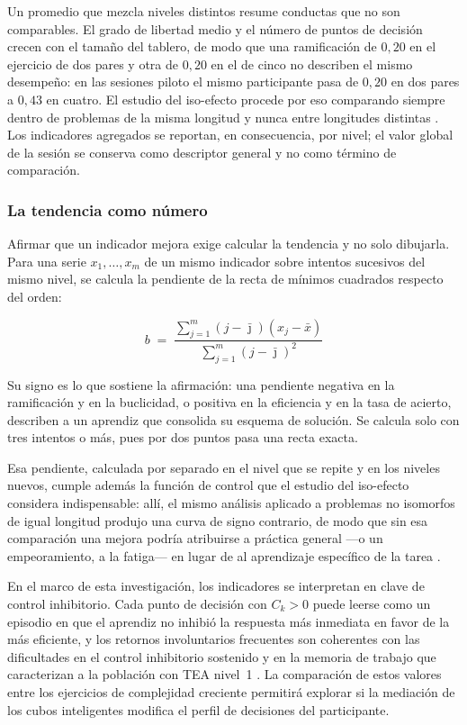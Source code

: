 \documentclass{book}
\begin{document}
Un promedio que mezcla niveles distintos resume conductas que no
son comparables. El grado de libertad medio y el número de puntos
de decisión crecen con el tamaño del tablero, de modo que una
ramificación de $0{,}20$ en el ejercicio de dos pares y otra de
$0{,}20$ en el de cinco no describen el mismo desempeño: en las
sesiones piloto el mismo participante pasa de $0{,}20$ en dos pares
a $0{,}43$ en cuatro. El estudio del iso-efecto procede por eso
comparando siempre dentro de problemas de la misma longitud y nunca
entre longitudes distintas \citep{HinzFaber2009}. Los indicadores
agregados se reportan, en consecuencia, por nivel; el valor global
de la sesión se conserva como descriptor general y no como término
de comparación.

\subsubsection*{La tendencia como número}

Afirmar que un indicador mejora exige calcular la tendencia y no
solo dibujarla. Para una serie $x_1, \ldots, x_m$ de un mismo
indicador sobre intentos sucesivos del mismo nivel, se calcula la
pendiente de la recta de mínimos cuadrados respecto del orden:

\begin{equation}
    b \;=\; \frac{\sum_{j=1}^{m}(j - \bar{\jmath})(x_j - \bar{x})}
                 {\sum_{j=1}^{m}(j - \bar{\jmath})^{2}}
    \label{eq:pendiente}
\end{equation}

Su signo es lo que sostiene la afirmación: una pendiente negativa
en la ramificación y en la buclicidad, o positiva en la eficiencia
y en la tasa de acierto, describen a un aprendiz que consolida su
esquema de solución. Se calcula solo con tres intentos o más, pues
por dos puntos pasa una recta exacta.

Esa pendiente, calculada por separado en el nivel que se repite y
en los niveles nuevos, cumple además la función de control que el
estudio del iso-efecto considera indispensable: allí, el mismo
análisis aplicado a problemas no isomorfos de igual longitud
produjo una curva de signo contrario, de modo que sin esa
comparación una mejora podría atribuirse a práctica general —o un
empeoramiento, a la fatiga— en lugar de al aprendizaje específico
de la tarea \citep{HinzFaber2009}.

En el marco de esta investigación, los indicadores se interpretan en
clave de control inhibitorio. Cada punto de decisión con $C_k > 0$
puede leerse como un episodio en que el aprendiz no inhibió la
respuesta más inmediata en favor de la más eficiente, y los retornos
involuntarios frecuentes son coherentes con las dificultades en el
control inhibitorio sostenido y en la memoria de trabajo que
caracterizan a la población con TEA nivel~1 \cite{Geurts2009,
Diamond2013}. La comparación de estos valores entre los ejercicios
de complejidad creciente permitirá explorar si la mediación de los
cubos inteligentes modifica el perfil de decisiones del
participante.
\end{document}
